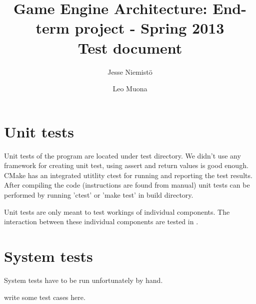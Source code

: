 \documentclass[11pt,twoside,a4paper]{article}
\begin{document}
\author{Jesse Niemistö \and Leo Muona}
\title{Game Engine Architecture: End-term project - Spring 2013 \\
       Test document}

\maketitle

\section{Unit tests}
\label{sec:unit_tests}

Unit tests of the program are located under test directory. We didn't use any framework for creating unit test, using assert and return values is good enough. CMake has an integrated utitlity ctest for running and reporting the test results. After compiling the code (instructions are found from manual) unit tests can be performed by running 'ctest' or 'make test' in build directory.

Unit tests are only meant to test workings of individual components. The interaction between these individual components are tested in .

\section{System tests}
\label{sec:system_tests}

System tests have to be run unfortunately by hand.

write some test cases here.
\end{document}

